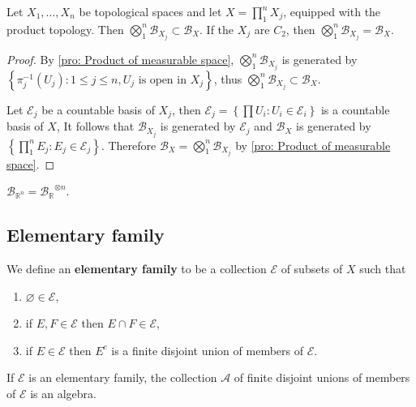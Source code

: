 \documentclass[12pt, a4paper, oneside]{book}
\begin{document}
\begin{proposition}
    Let $X_1, \ldots, X_n$ be topological spaces and let $X=\prod_1^n X_j$, equipped with the product topology.
    Then $\bigotimes_1^n \mathcal{B}_{X_j} \subset \mathcal{B}_X$. If the $X_j$ are $C_2$, then $\bigotimes_1^n \mathcal{B}_{X_j}=\mathcal{B}_X$.
    \begin{proof}
        By \ref{pro: Product of measurable space}, $\bigotimes_1^n \mathcal{B}_{X_j}$ is generated by $\left\{\pi_j^{-1}\left(U_j\right): 1 \leq j \leq n,U_j \text{ is open in } X_j\right\}$, thus $\bigotimes_1^n \mathcal{B}_{X_j} \subset \mathcal{B}_X$.

        Let $\mathcal{E}_j$ be a countable basis of $X_j$, then $\mathcal{E}_j=\left\{\prod U_i :U_i\in \mathcal{E}_i\right\}$ is a countable basis of $X$,
        It follows that $\mathcal{B}_{X_j}$ is generated by $\mathcal{E}_j$ and $\mathcal{B}_X$ is generated by $\left\{\prod_1^n E_j: E_j \in \mathcal{E}_j\right\}$. Therefore $\mathcal{B}_X=\bigotimes_1^n \mathcal{B}_{X_j}$ by \ref{pro: Product of measurable space}.
    \end{proof}
\end{proposition}

\begin{corollary}
    $\mathcal{B}_{\mathbb{R}^n}={\mathcal{B}_{\mathbb{R}}}^{\otimes n}$.
\end{corollary}

\subsection{Elementary family}
\begin{definition}
    We define an \textbf{elementary family} to be a collection $\mathcal{E}$ of subsets of $X$ such that
    \begin{enumerate}[label=(\roman*)]
        \item
              $\varnothing \in \mathcal{E}$,
        \item
              if $E, F \in \mathcal{E}$ then $E \cap F \in \mathcal{E}$,
        \item
              if $E \in \mathcal{E}$ then $E^c$ is a finite disjoint union of members of $\mathcal{E}$.
    \end{enumerate}
\end{definition}

\begin{proposition}
    If $\mathcal{E}$ is an elementary family, the collection $\mathcal{A}$ of finite disjoint unions of members of $\mathcal{E}$ is an algebra.
\end{proposition}
\end{document}
